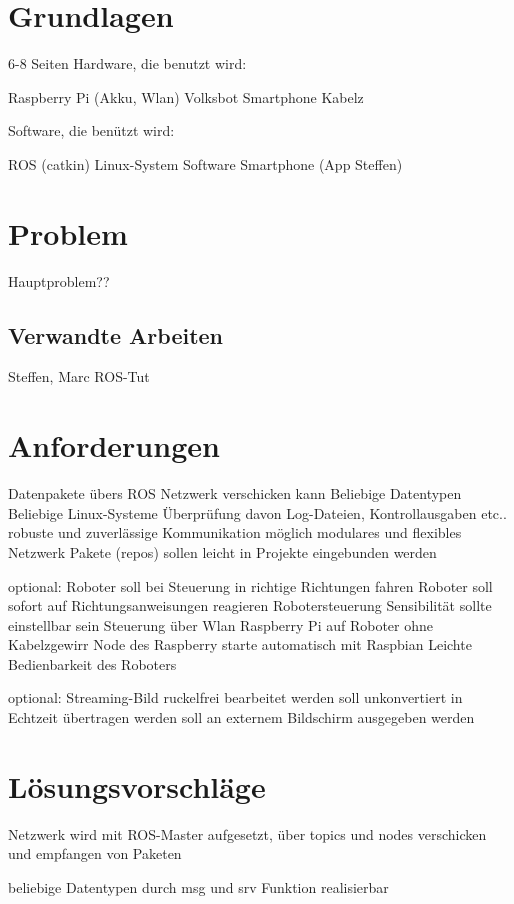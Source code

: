\documentclass[12pt]{article}
\begin{document}
\section{Grundlagen}
6-8 Seiten
Hardware, die benutzt wird:

Raspberry Pi (Akku, Wlan)
Volksbot
Smartphone
Kabelz

Software, die benützt wird:

ROS (catkin)
Linux-System
Software Smartphone (App Steffen)

\section{Problem}

Hauptproblem??

\subsection{Verwandte Arbeiten}

Steffen, Marc
ROS-Tut

\section{Anforderungen}

Datenpakete übers ROS Netzwerk verschicken kann
Beliebige Datentypen
Beliebige Linux-Systeme
Überprüfung davon Log-Dateien, Kontrollausgaben etc..
robuste und zuverlässige Kommunikation möglich
modulares und flexibles Netzwerk
Pakete (repos) sollen leicht in Projekte eingebunden werden

optional:
Roboter soll bei Steuerung in richtige Richtungen fahren
Roboter soll sofort auf Richtungsanweisungen reagieren
Robotersteuerung Sensibilität sollte einstellbar sein
Steuerung über Wlan
Raspberry Pi auf Roboter ohne Kabelzgewirr
Node des Raspberry starte automatisch mit Raspbian
Leichte Bedienbarkeit des Roboters

optional:
Streaming-Bild ruckelfrei bearbeitet werden
soll unkonvertiert in Echtzeit übertragen werden
soll an externem Bildschirm ausgegeben werden

\section{Lösungsvorschläge}

Netzwerk wird mit ROS-Master aufgesetzt, über topics und nodes
verschicken und empfangen von Paketen 

beliebige Datentypen durch msg und srv Funktion realisierbar
\end{document}
